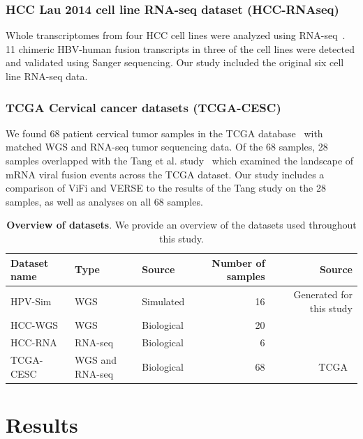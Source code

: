 \documentclass[12pt]{article}
\begin{document}
\subsubsection{HCC Lau 2014 cell line RNA-seq dataset (HCC-RNAseq)}
Whole transcriptomes from four HCC cell lines were analyzed using RNA-seq~\cite{Lau2014}.  11 chimeric HBV-human fusion transcripts in three of the cell lines were detected and validated using Sanger sequencing.  Our study included the original six cell line RNA-seq data.  

\subsubsection{TCGA Cervical cancer datasets (TCGA-CESC)}
We found 68  patient cervical tumor samples in the TCGA database~\cite{TODO} with matched WGS and RNA-seq tumor sequencing data.  Of the 68 samples, 28 samples overlapped with the Tang et al. study~\cite{Tang2013} which examined the landscape of mRNA viral fusion events across the TCGA dataset.  Our study includes a comparison of ViFi and VERSE to the results of the Tang study on the 28 samples, as well as analyses on all 68 samples.


\begin{table}[htb]
\centering
\caption{\textbf{Overview of datasets}.  We provide an overview of the datasets used throughout this study.  }
\label{table:data}
\begin{tabular}{|l|l|l|r|r|}
\hline
Dataset name & Type & Source & Number of samples & Source \\ \hline
HPV-Sim & WGS &Simulated& 16 & Generated for this study \\ \hline
HCC-WGS & WGS & Biological&20 & ~\cite{Sung2012} \\ \hline
HCC-RNA & RNA-seq & Biological&6 & ~\cite{Lau2014} \\ \hline
TCGA-CESC & WGS and RNA-seq &Biological& 68 & TCGA~\cite{TODO} \\ \hline 
\end{tabular}
\end{table}
\section{Results}

\end{document}

